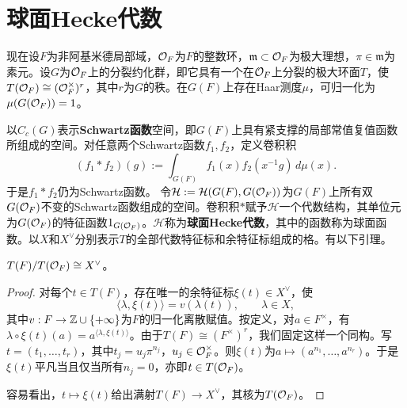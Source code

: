 \section{球面Hecke代数}\label{L19S2}
现在设$F$为非阿基米德局部域，$\mathcal O_F$为$F$的整数环，$\mathfrak m\subset\mathcal O_F$为极大理想，$\pi\in\mathfrak m$为素元。设$G$为$\mathcal O_F$上的分裂约化群，即它具有一个在$\mathcal O_F$上分裂的极大环面$T$，使$T(\mathcal O_F)\cong(\mathcal O_F^\times)^r$，其中$r$为$G$的秩。在$G(F)$上存在Haar测度$\mu$，可归一化为$\mu(G(\mathcal O_F))=1$。

以$C_c(G)$表示\textbf{Schwartz函数}空间，即$G(F)$上具有紧支撑的局部常值复值函数所组成的空间。对任意两个Schwartz函数$f_1,f_2$，定义卷积积
\begin{equation}\tag{2.1}\label{L19eq21}(f_1*f_2)(g):=\int_{G(F)}f_1(x)f_2(x^{-1}g)\,d\mu(x).\end{equation}
于是$f_1*f_2$仍为Schwartz函数。
令$\mathcal H:=\mathcal H(G(F),G(\mathcal O_F))$为$G(F)$上所有双$G(\mathcal O_F)$不变的Schwartz函数组成的空间。卷积积$*$赋予$\mathcal H$一个代数结构，其单位元为$G(\mathcal O_F)$的特征函数$1_{G(\mathcal O_F)}$。$\mathcal H$称为\textbf{球面Hecke代数}，其中的函数称为球面函数。以$X$和$X^\vee$分别表示$T$的全部代数特征标和余特征标组成的格。有以下引理。
\begin{lemma}\label{L19S2O1}$T(F)/T(\mathcal O_F)\cong X^\vee$。\end{lemma}
\begin{proof}
对每个$t\in T(F)$，存在唯一的余特征标$\xi(t)\in X^\vee$，使
\[\langle\lambda,\xi(t)\rangle=v(\lambda(t)),\qquad\lambda\in X,\]
其中$v:F\to\mathbb{Z}\cup\{+\infty\}$为$F$的归一化离散赋值。按定义，对$a\in F^\times$，有$\lambda\circ\xi(t)(a)=a^{\langle\lambda,\xi(t)\rangle}$。由于$T(F)\cong(F^\times)^r$，我们固定这样一个同构。写$t=(t_1,\ldots,t_r)$，其中$t_j=u_j\pi^{n_j}$，$u_j\in\mathcal O_F^\times$。则$\xi(t)$为$a\mapsto(a^{n_1},\ldots,a^{n_r})$。于是$\xi(t)$平凡当且仅当所有$n_j=0$，亦即$t\in T(\mathcal O_F)$。

容易看出，$t\mapsto\xi(t)$给出满射$T(F)\to X^\vee$，其核为$T(\mathcal O_F)$。
\end{proof}
